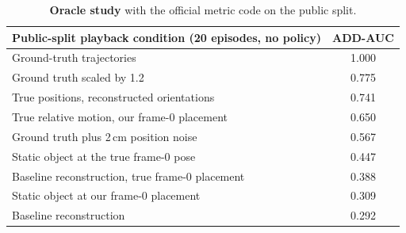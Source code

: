 \documentclass[10pt]{nvidiaextabstract}
\begin{document}
\begin{table}[h]
  \centering\small
  \begin{tabular}{@{}lc@{}}
    \toprule
    \textbf{Public-split playback condition (20 episodes, no policy)} & \textbf{ADD-AUC} \\
    \midrule
    Ground-truth trajectories & 1.000 \\
    Ground truth scaled by 1.2 & 0.775 \\
    True positions, reconstructed orientations & 0.741 \\
    True relative motion, our frame-0 placement & 0.650 \\
    Ground truth plus 2\,cm position noise & 0.567 \\
    Static object at the true frame-0 pose & 0.447 \\
    Baseline reconstruction, true frame-0 placement & 0.388 \\
    Static object at our frame-0 placement & 0.309 \\
    Baseline reconstruction & 0.292 \\
    \bottomrule
  \end{tabular}
  \caption{\textbf{Oracle study} with the official metric code on the public split.}
  \label{tab:oracle}
\end{table}
\end{document}
